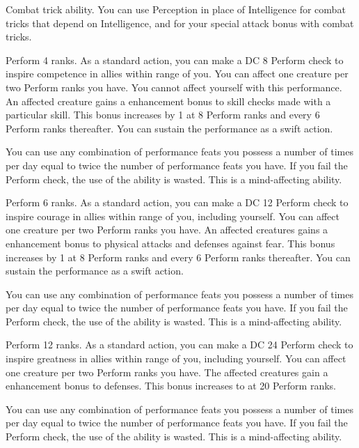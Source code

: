 \featpre Combat trick ability.
\featben You can use Perception in place of Intelligence for combat tricks that depend on Intelligence, and for your special attack bonus with combat tricks.

\featpre Perform 4 ranks.
\featben As a standard action, you can make a DC 8 Perform check to inspire competence in allies within \rngmed range of you.
You can affect one creature per two Perform ranks you have.
You cannot affect yourself with this performance.
An affected creature gains a  enhancement bonus to skill checks made with a particular skill.
This bonus increases by 1 at 8 Perform ranks and every 6 Perform ranks thereafter.
You can sustain the performance as a swift action.

You can use any combination of performance feats you possess a number of times per day equal to twice the number of performance feats you have.
If you fail the Perform check, the use of the ability is wasted.
This is a mind-affecting ability.

\featpre Perform 6 ranks.
\featben As a standard action, you can make a DC 12 Perform check to inspire courage in allies within \rngmed range of you, including yourself.
You can affect one creature per two Perform ranks you have.
An affected creatures gains a  enhancement bonus to physical attacks and defenses against fear.
This bonus increases by 1 at 8 Perform ranks and every 6 Perform ranks thereafter.
You can sustain the performance as a swift action.

You can use any combination of performance feats you possess a number of times per day equal to twice the number of performance feats you have.
If you fail the Perform check, the use of the ability is wasted.
This is a mind-affecting ability.

\featpre Perform 12 ranks.
\featben As a standard action, you can make a DC 24 Perform check to inspire greatness in allies within \rngmed range of you, including yourself.
You can affect one creature per two Perform ranks you have.
The affected creatures gain a  enhancement bonus to defenses.
This bonus increases to  at 20 Perform ranks.

You can use any combination of performance feats you possess a number of times per day equal to twice the number of performance feats you have.
If you fail the Perform check, the use of the ability is wasted.
This is a mind-affecting ability.

